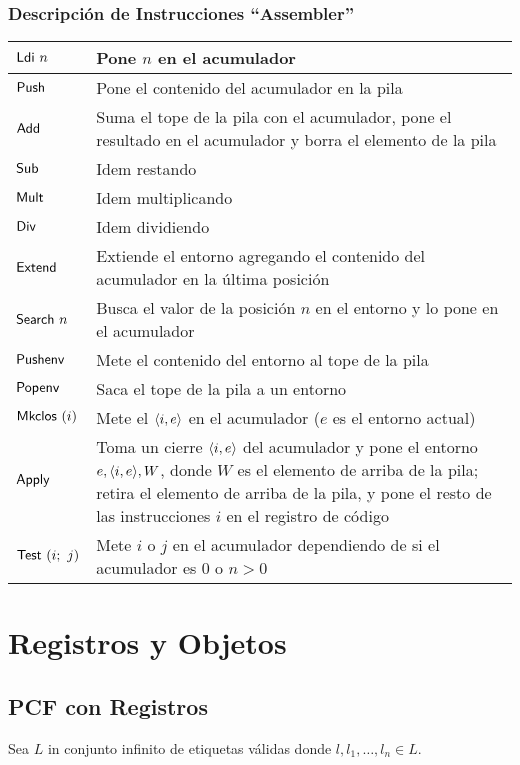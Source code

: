 \documentclass[twoside,a4paper,12pt]{article}
\theoremstyle{definition}
\theoremstyle{remark}
\begin{document}
\newpage
\subsubsection*{Descripción de Instrucciones ``Assembler''}
\begin{tabular}{lp{12.6cm}}\\
  \hline $\mathsf{Ldi}~n$    & Pone $n$ en el acumulador \\
  \hline $\mathsf{Push}$     & Pone el contenido del acumulador en la pila \\
  \hline $\mathsf{Add}$      & Suma el tope de la pila con el acumulador, pone el resultado en el acumulador y borra el elemento de la pila \\
  \hline $\mathsf{Sub}$      & Idem restando \\
  \hline $\mathsf{Mult}$     & Idem multiplicando \\
  \hline $\mathsf{Div}$      & Idem dividiendo \\
  \hline $\mathsf{Extend}$   & Extiende el entorno agregando el contenido del acumulador en la última posición \\
  \hline $\mathsf{Search}~n$ & Busca el valor de la posición $n$ en el entorno y lo pone en el acumulador \\
  \hline $\mathsf{Pushenv}$  & Mete el contenido del entorno al tope de la pila \\
  \hline $\mathsf{Popenv}$   & Saca el tope de la pila a un entorno \\
  \hline $\mathsf{Mkclos}~(i)$ & Mete el $\langle{i},{e}\rangle$ en el acumulador ($e$ es el entorno actual) \\
  \hline $\mathsf{Apply}$    & Toma un cierre $\langle{i},{e}\rangle$ del acumulador
  y pone el entorno $e, \langle{i},{e}\rangle, W$, donde $W$ es el elemento de
  arriba de la pila; retira el elemento de arriba de la pila, y pone el
  resto de las instrucciones $i$ en el registro de código \\
  \hline $\mathsf{Test}~(i;~j)$  & Mete $i$ o $j$ en el acumulador dependiendo de si el acumulador es $0$ o $n>0$ \\ 
  \hline
\end{tabular}
\newpage
\section*{Registros y Objetos}

\subsection*{PCF con Registros}

Sea $L$ in conjunto infinito de etiquetas válidas donde $l,l_1,\dots,l_n\in L$.
\end{document}
